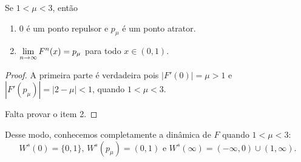 \begin{proposition}
Se $1 < \mu < 3$, então
\begin{enumerate}
\item $0$ é um ponto repulsor e $p_\mu$ é um ponto atrator.
\item $\displaystyle\lim_{n \to \infty} F^n(x) = p_\mu$ para todo $x \in (0, 1)$.
\end{enumerate}
\end{proposition}

\begin{proof}
A primeira parte é verdadeira pois $|F'(0)| = \mu > 1$ e $|F'(p_\mu)| = |2 - \mu| < 1$, quando $1 < \mu < 3$.

Falta provar o item 2.
\end{proof}

Desse modo, conhecemos completamente a dinâmica de $F$ quando $1 < \mu < 3$: $$W^s(0) = \{0, 1\}\textrm{, } W^s(p_\mu) = (0, 1)\textrm{ e }W^s(\infty) = (-\infty, 0) \cup (1, \infty).$$